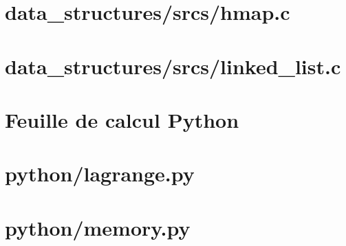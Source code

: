 \documentclass{article}
\begin{document}
\section*{data\_structures/srcs/hmap.c}


\section*{data\_structures/srcs/linked\_list.c}

\newpage

\section{Feuille de calcul Python}

\section*{python/lagrange.py}


\section*{python/memory.py}

\end{document}

